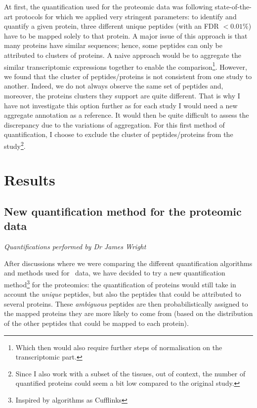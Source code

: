 At first, the quantification used for the proteomic data was following
state-of-the-art protocols for which we applied very stringent parameters:
to identify and quantify a given protein, three different unique peptides
(with an \gls{FDR} $< 0.01 \%$) have to be mapped solely to that protein.
A major issue of this approach is that many proteins have similar sequences;
hence, some peptides can only be attributed to clusters of proteins.
A naive approach would
be to aggregate the similar transcriptomic expressions together to enable
the comparison\footnote{Which then would also require further steps of
normalisation on the transcriptomic part.}. However, we found that the cluster
of peptides/proteins is not consistent from one study to another. Indeed, we do
not always observe the same set of peptides and, moreover, the proteins clusters
they support are quite different. That is why I have not investigate this option
further as for each study I would need a new aggregate annotation as a reference.
It would then be quite difficult to assess the discrepancy due to the
variations of aggregation. For this first method of quantification, I choose to
exclude the cluster of peptides/proteins from the study\footnote{Since I also work
with a subset of the tissues, out of context, the number of quantified proteins
could seem a bit low compared to the original study.}.


\section{Results}
\label{sec:IntegrationResults}

\subsection{New quantification method for the proteomic data}
\label{subsec:IntegrationNewMethQuant}

\textit{Quantifications performed by Dr James Wright}

After discussions where we were comparing the different quantification algorithms
and methods used for \Rnaseq\ data, we have decided to try a new quantification
method\footnote{Inspired by algorithms as Cufflinks} for the proteomics:
the quantification of proteins would still take in account the \emph{unique} peptides,
but also the peptides that could be attributed to several proteins.
These \emph{ambiguous} peptides are then probabilistically assigned to the
mapped proteins they are more likely to come from (based on the distribution of
the other peptides that could be mapped to each protein).

